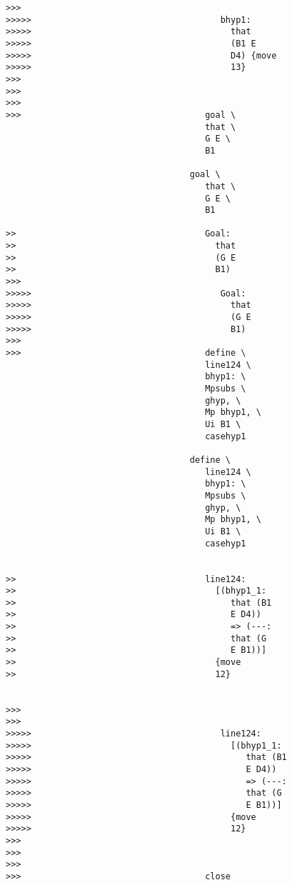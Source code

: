 \documentclass[12pt]{article}
\begin{document}
\begin{verbatim}
>>>
>>>>>                                     bhyp1:
>>>>>                                       that
>>>>>                                       (B1 E
>>>>>                                       D4) {move
>>>>>                                       13}
>>>
>>>
>>>
>>>                                    goal \
                                       that \
                                       G E \
                                       B1

                                    goal \
                                       that \
                                       G E \
                                       B1

>>                                     Goal:
>>                                       that
>>                                       (G E
>>                                       B1)
>>>
>>>>>                                     Goal:
>>>>>                                       that
>>>>>                                       (G E
>>>>>                                       B1)
>>>
>>>                                    define \
                                       line124 \
                                       bhyp1: \
                                       Mpsubs \
                                       ghyp, \
                                       Mp bhyp1, \
                                       Ui B1 \
                                       casehyp1

                                    define \
                                       line124 \
                                       bhyp1: \
                                       Mpsubs \
                                       ghyp, \
                                       Mp bhyp1, \
                                       Ui B1 \
                                       casehyp1


>>                                     line124:
>>                                       [(bhyp1_1:
>>                                          that (B1
>>                                          E D4))
>>                                          => (---:
>>                                          that (G
>>                                          E B1))]
>>                                       {move
>>                                       12}


>>>
>>>
>>>>>                                     line124:
>>>>>                                       [(bhyp1_1:
>>>>>                                          that (B1
>>>>>                                          E D4))
>>>>>                                          => (---:
>>>>>                                          that (G
>>>>>                                          E B1))]
>>>>>                                       {move
>>>>>                                       12}
>>>
>>>
>>>
>>>                                    close


\end{verbatim}
\end{document}
